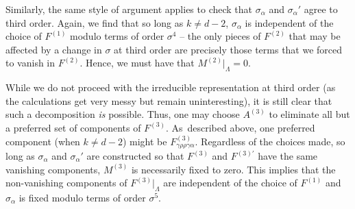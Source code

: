 \documentclass[pdftex]{sigma}
\numberwithin{equation}{section}
\renewcommand{\=}{\stackrel \Lambda =}
\begin{document}
Similarly, the same style of argument applies to check that $\sigma_{\alpha}$ and $\sigma_{\alpha}'$ agree to third order. Again, we find that so long as $k \neq d-2$, $\sigma_{\alpha}$ is independent of the choice of $F^{(1)}$ modulo terms of order $\sigma^4$ -- the only pieces of $F^{(2)}$ that may be affected by a change in $\sigma$ at third order are precisely those terms that we forced to vanish in $F^{(2)}$. Hence, we must have that $M^{(2)}|_{\Lambda} = 0$.

While we do not proceed with the irreducible representation at third order (as the calculations get very messy but remain uninteresting), it is still clear that such a decomposition \textit{is} possible. Thus, one may choose $A^{(3)}$ to eliminate all but a preferred set of components of $F^{(3)}$. As~described above, one preferred component (when $k \neq d-2$) might be $F^{(3)}_{\gamma \rho \rho \gamma \alpha}$. Regardless of the choices made, so long as $\sigma_{\alpha}$ and $\sigma_{\alpha}'$ are constructed so that $F^{(3)}$ and $F^{(3)'}$ have the same vanishing components, $M^{(3)}$ is necessarily fixed to zero. This implies that the non-vanishing components of $F^{(3)}|_{\Lambda}$ are independent of the choice of $F^{(1)}$ and $\sigma_{\alpha}$ is fixed modulo terms of order $\sigma^5$.
\end{document}
